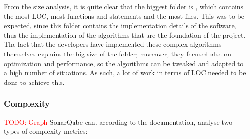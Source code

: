             From the size analysis, it is quite clear that the biggest folder is , which contains the most LOC, most functions and statements and the most files. This was to be expected, since this folder contains the implementation details of the software, thus the implementation of the algorithms that are the foundation of the project. The fact that the developers have implemented these complex algorithms themselves explains the big size of the folder; moreover, they focused also on optimization and performance, so the algorithms can be tweaked and adapted to a high number of situations. As such, a lot of work in terms of LOC needed to be done to achieve this.
        
        \subsubsection{Complexity}
            \textcolor{red}{TODO: Graph}
            SonarQube can, according to the documentation, analyse two types of complexity metrics: 
